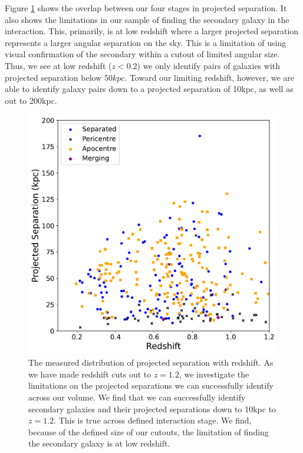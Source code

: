 Figure \ref{fig:proj-seps-limits} shows the overlap between our four stages in projected separation. It also shows the limitations in our sample of finding the secondary galaxy in the interaction. This, primarily, is at low redshift where a larger projected separation represents a larger angular separation on the sky. This is a limitation of using visual confirmation of the secondary within a cutout of limited angular size. Thus, we see at low redshift ($z < 0.2$) we only identify pairs of galaxies with projected separation below $50kpc$. Toward our limiting redshift, however, we are able to identify galaxy pairs down to a projected separation of 10kpc, as well as out to 200kpc. 

\begin{figure}
\centering
\includegraphics[width=\textwidth]{Chapter3/figures/redshift-proj-sep-diagnostic.pdf}
\caption[The measured distribution of projected separation with redshift.]{The measured distribution of projected separation with redshift. As we have made redshift cuts out to $z = 1.2$, we investigate the limitations on the projected separations we can successfully identify across our volume. We find that we can successfully identify secondary galaxies and their projected separations down to 10kpc to $z=1.2$. This is true across defined interaction stage. We find, because of the defined size of our cutouts, the limitation of finding the secondary galaxy is at low redshift.}
\label{fig:proj-seps-limits}
\end{figure}

